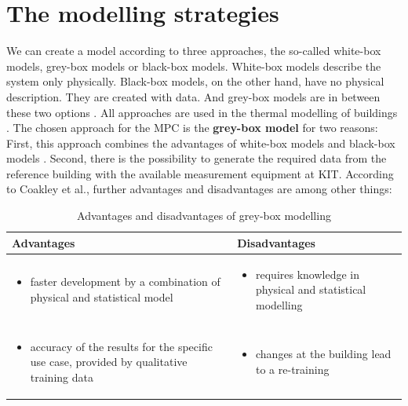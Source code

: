     \section{The modelling strategies}
    \label{ModellingStrategies}
    We can create a model according to three approaches, the so-called white-box models, grey-box models or black-box models. White-box models describe the system only physically. Black-box models, on the other hand, have no physical description. They are created with data. And grey-box models are in between these two options \cite{Statusseminar.ForschungfurEnergieoptimiertesBauen.2009}. All approaches are used in the thermal modelling of buildings \cite{Kramer.2012}.
    \newline
    The chosen approach for the MPC is the \textbf{grey-box model} for two reasons: First, this approach combines the advantages of white-box models and black-box models \cite{EstradaFlores.2006}. Second, there is the possibility to generate the required data from the reference building with the available measurement equipment at KIT. According to Coakley et al., further advantages and disadvantages are among other things\cite{Coakley.2014}:
    \begin{table}[h!]
    \label{Advantages and disadvantages of grey-box modelling}
        \centering
        \begin{tabular}{p{7.3cm} | p{7.3cm}}
        \hline
          Advantages  &  Disadvantages\\
        \hline
        \begin{itemize}
            \item faster development by a combination of physical and statistical model
        \end{itemize}
      & \begin{itemize}
            \item requires knowledge in physical and statistical modelling 
        \end{itemize}\\
     \begin{itemize}
            \item accuracy of the results for the specific use case, provided by qualitative training data
        \end{itemize} & \begin{itemize}
            \item changes at the building lead to a re-training
        \end{itemize}\\
        \end{tabular}
        \caption {Advantages and disadvantages of grey-box modelling}
    \end{table}

